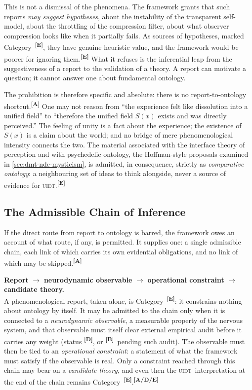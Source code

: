 \documentclass[12pt,a4paper,twoside]{article}
\theoremstyle{plain}
\theoremstyle{definition}
\theoremstyle{remark}
\newcommand{\UIDT}{\textsc{uidt}}
\newcommand{\catmark}[1]{\textsuperscript{\textsf{\textbf{[#1]}}}}
\begin{document}
This is not a dismissal of the phenomena. The framework grants that such reports \emph{may suggest hypotheses}, about the instability of the transparent self-model, about the throttling of the compression filter, about what observer compression looks like when it partially fails. As sources of hypotheses, marked Category~\catmark{E}, they have genuine heuristic value, and the framework would be poorer for ignoring them.\catmark{E} What it refuses is the inferential leap from the suggestiveness of a report to the validation of a theory. A report can motivate a question; it cannot answer one about fundamental ontology.

The prohibition is therefore specific and absolute: there is no report-to-ontology shortcut.\catmark{A} One may not reason from ``the experience felt like dissolution into a unified field'' to ``therefore the unified field $S(x)$ exists and was directly perceived.'' The feeling of unity is a fact about the experience; the existence of $S(x)$ is a claim about the world; and no bridge of mere phenomenological intensity connects the two. The material associated with the interface theory of perception and with psychedelic ontology, the Hoffman-style proposals examined in \cref{sec:dmt-nde-mysticism}, is admitted, in consequence, strictly as \emph{comparative ontology}: a neighbouring set of ideas to think alongside, never a source of evidence for \UIDT.\catmark{E}

\subsection{The Admissible Chain of Inference}
\label{subsec:admissible-chain}

If the direct route from report to ontology is barred, the framework owes an account of what route, if any, is permitted. It supplies one: a single admissible chain, each link of which carries its own evidential obligations, and no link of which may be skipped.\catmark{A}

\begin{governancebox}
\textbf{Report} $\longrightarrow$ \textbf{neurodynamic observable} $\longrightarrow$ \textbf{operational constraint} $\longrightarrow$
\textbf{candidate theory.}\\[0.4em]
A phenomenological report, taken alone, is Category~\catmark{E}: it constrains nothing about ontology by itself. It may be admitted to the chain only when it is connected to a \emph{neurodynamic observable}, a measurable property of the nervous system, and that observable must itself clear external empirical audit before it carries any weight (status \catmark{D}, or \catmark{B}\ pending such audit). The observable must then be tied to an \emph{operational constraint}: a statement of what the framework must satisfy if the observable is real. Only a constraint reached through this chain may bear on a \emph{candidate theory}, and even then the \UIDT\ interpretation at the end of the chain remains Category~\catmark{E}.\catmark{A/D/E}
\end{governancebox}
\end{document}
